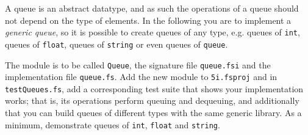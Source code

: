 A queue is an abstract datatype, and as such the operations of a queue should not depend on the type of elements.
In the following you are to implement a \textit{generic queue}, so it is possible to create queues of any type, e.g. queues of \texttt{int}, queues of \texttt{float}, queues of \texttt{string} or even queues of \texttt{queue}.

The module is to be called \lstinline{Queue}, the signature file \texttt{queue.fsi} and the implementation file \texttt{queue.fs}.
Add the new module to \texttt{5i.fsproj} and in \texttt{testQueues.fs}, add a corresponding test suite that shows your implementation works; that is, its operations perform queuing and dequeuing, and additionally that you can build queues of different types with the same generic library.
As a minimum, demonstrate queues of \texttt{int}, \texttt{float} and \texttt{string}.